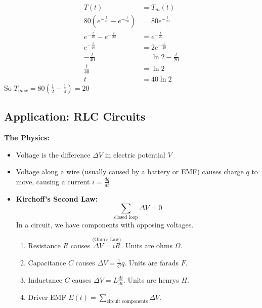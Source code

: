 \documentclass[../main.tex]{subfiles}
\begin{document}
\begin{example}[]
\begin{enumerate}[mode=unboxed,label=\alph*)]
            \begin{align*}
                T(t) &= T_m(t) \\
                80(e^{-\frac{t}{40}}-e^{-\frac{t}{20}}) &= 80e^{-\frac{t}{20}} \\
                e^{-\frac{t}{40}}-e^{-\frac{t}{20}} &= e^{-\frac{t}{20}} \\
                e^{-\frac{t}{40}} &= 2e^{-\frac{t}{20}} \\
                -\frac{t}{40} &= \ln 2 - \frac{t}{20} \\
                \frac{t}{40} &= \ln 2 \\
                t &= 40\ln 2
            \end{align*}
            So \( T_{max} = 80\left( \frac{1}{2}-\frac{1}{4} \right) = \boxed{20} \)
    \end{enumerate}
\end{example}


\subsection{Application: RLC Circuits}

\textbf{The Physics:}
\begin{itemize}[mode=unboxed]
    \item Voltage is the difference \( \Delta V \) in electric potential \( V \)
    \item Voltage along a wire (usually caused by a battery or EMF) causes charge \( q \) to move,
        causing a current \( \displaystyle i = \frac{dq}{dt} \)
    \item \textbf{Kirchoff's Second Law:}
        \[ \sum_{\text{closed loop}} \Delta V = 0 \]
        In a circuit, we have components with opposing voltages.
        \begin{enumerate}
            \item Resistance \( R \) causes \( \overset{\text{(Ohm's Law)}}{\Delta V = iR} \). Units are ohms \( \Omega \).
            \item Capacitance \( C \) causes \( \displaystyle \Delta V = \frac{1}{C}q \). Units are farads \( F \).
            \item Inductance \( C \) causes \( \displaystyle \Delta V = L\frac{di}{dt} \). Units are henrys \( H \).
            \item Driver EMF \( E(t)=\sum_{\text{circuit components}} \Delta V \).
        \end{enumerate}
\end{itemize}
\end{document}
